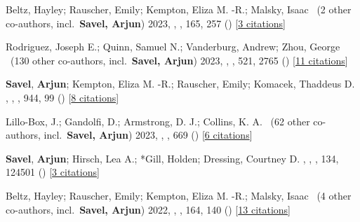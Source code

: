 \item[{\color{numcolor}\scriptsize22}] Beltz, Hayley; Rauscher, Emily; Kempton, Eliza M. -R.; Malsky, Isaac \etal\ ({2} other co-authors, incl.\ \textbf{Savel, Arjun}) 2023, , \aj, {165}, 257 () [\href{https://ui.adsabs.harvard.edu/abs/2023AJ....165..257B}{3 citations}]

\item[{\color{numcolor}\scriptsize21}] Rodriguez, Joseph E.; Quinn, Samuel N.; Vanderburg, Andrew; Zhou, George \etal\ ({130} other co-authors, incl.\ \textbf{Savel, Arjun}) 2023, , \mnras, {521}, 2765 () [\href{https://ui.adsabs.harvard.edu/abs/2023MNRAS.521.2765R}{11 citations}]

\item[{\color{numcolor}\scriptsize20}] \textbf{Savel}, \textbf{Arjun}; Kempton, Eliza M. -R.; Rauscher, Emily; Komacek, Thaddeus D. , , \apj, {944}, 99 () [\href{https://ui.adsabs.harvard.edu/abs/2023ApJ...944...99S}{8 citations}]

\item[{\color{numcolor}\scriptsize19}] Lillo-Box, J.; Gandolfi, D.; Armstrong, D. J.; Collins, K. A. \etal\ ({62} other co-authors, incl.\ \textbf{Savel, Arjun}) 2023, , \aanda, {669} () [\href{https://ui.adsabs.harvard.edu/abs/2023A&A...669A.109L}{6 citations}]

\item[{\color{numcolor}\scriptsize18}] \textbf{Savel}, \textbf{Arjun}; Hirsch, Lea A.; *Gill, Holden; Dressing, Courtney D. , , \pasp, {134}, 124501 () [\href{https://ui.adsabs.harvard.edu/abs/2022PASP..134l4501S}{3 citations}]

\item[{\color{numcolor}\scriptsize17}] Beltz, Hayley; Rauscher, Emily; Kempton, Eliza M. -R.; Malsky, Isaac \etal\ ({4} other co-authors, incl.\ \textbf{Savel, Arjun}) 2022, , \aj, {164}, 140 () [\href{https://ui.adsabs.harvard.edu/abs/2022AJ....164..140B}{13 citations}]

